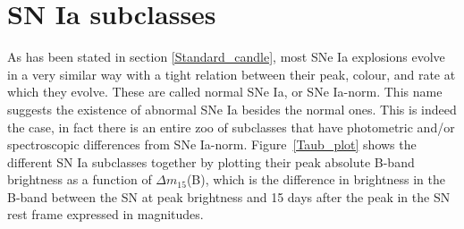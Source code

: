 \documentclass[a4paper,oneside,12pt, class=Latex/Classes/PhDthesisPSnPDF, crop=false]{standalone}
\begin{document}
\section{SN Ia subclasses}
As has been stated in section \ref{Standard_candle}, most SNe Ia explosions evolve in a very similar way with a tight relation between their peak, colour, and rate at which they evolve. These are called normal SNe Ia, or SNe Ia-norm. This name suggests the existence of abnormal SNe Ia besides the normal ones. This is indeed the case, in fact there is an entire zoo of subclasses that have photometric and/or spectroscopic differences from SNe Ia-norm. Figure~\ref{Taub_plot} \citep[taken from][]{Taubenberger_plot} shows the different SN Ia subclasses together by plotting their peak absolute B-band brightness as a function of $\Delta m_{15}$(B), which is the difference in brightness in the B-band between the SN at peak brightness and 15 days after the peak in the SN rest frame expressed in magnitudes.%
\end{document}
